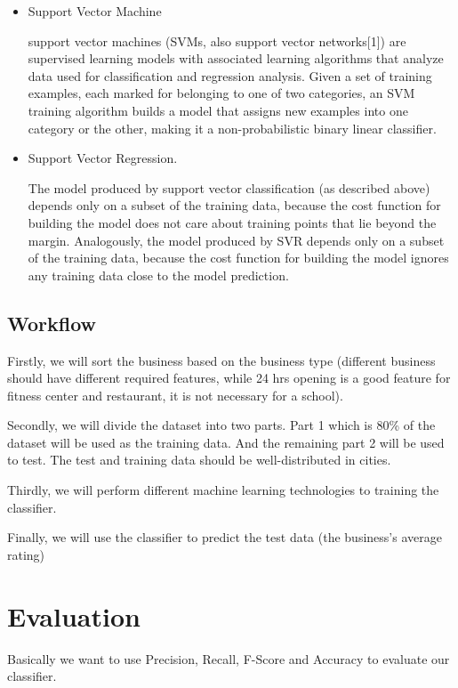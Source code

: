 \documentclass{article}
\begin{document}
\begin{itemize}
\item Support Vector Machine

support vector machines (SVMs, also support vector networks[1]) are supervised learning models with associated learning algorithms that analyze data used for classification and regression analysis. Given a set of training examples, each marked for belonging to one of two categories, an SVM training algorithm builds a model that assigns new examples into one category or the other, making it a non-probabilistic binary linear classifier. 

\item Support Vector Regression. 

The model produced by support vector classification (as described above) depends only on a subset of the training data, because the cost function for building the model does not care about training points that lie beyond the margin. Analogously, the model produced by SVR depends only on a subset of the training data, because the cost function for building the model ignores any training data close to the model prediction. 


\end{itemize}

\subsection{Workflow}

Firstly, we will sort the business based on the business type (different business should have different required features, while 24 hrs opening  is a good feature for fitness center and restaurant, it is not necessary for a school).

Secondly, we will divide the dataset into two parts. Part 1 which is 80\% of the dataset will be used as the training data. And the remaining part 2 will be used to test. The test and training data should be well-distributed in cities.

Thirdly, we will perform different machine learning technologies to training the classifier.

Finally, we will use the classifier to predict the test data (the business's average rating)

\section{Evaluation}
Basically we want to use Precision, Recall, F-Score and Accuracy to evaluate our classifier. 


\end{document}
